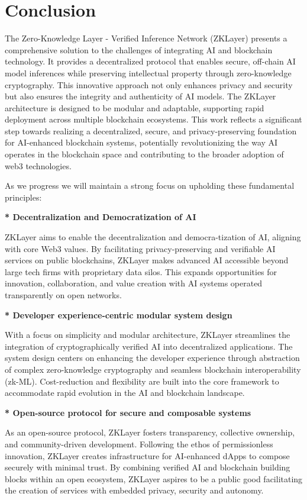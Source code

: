 \documentclass[conference]{IEEEtran}
\begin{document}
\section{Conclusion}
The Zero-Knowledge Layer - Veriﬁed Inference Network (ZKLayer) presents a comprehensive solution to the challenges of integrating AI and blockchain technology. It provides a decentralized protocol that enables secure, off-chain AI model inferences while preserving intellectual property through zero-knowledge cryptography. This innovative approach not only enhances privacy and security but also ensures the integrity and authenticity of AI models. The ZKLayer architecture is designed to be modular and adaptable, supporting rapid deployment across multiple blockchain ecosystems. This work reﬂects a signiﬁcant step towards realizing a decentralized, secure, and privacy-preserving foundation for AI-enhanced blockchain systems, potentially revolutionizing the way AI operates in the blockchain space and contributing to the broader adoption of web3 technologies.

As we progress we will maintain a strong focus on upholding these fundamental principles:

\textbf{* Decentralization and Democratization of AI}

ZKLayer aims to enable the decentralization and democra-tization of AI, aligning with core Web3 values. By facilitating privacy-preserving and veriﬁable AI services on public blockchains, ZKLayer makes advanced AI accessible beyond large tech ﬁrms with proprietary data silos. This expands opportunities for innovation, collaboration, and value creation with AI systems operated transparently on open networks.

\textbf{* Developer experience-centric modular system design}

With a focus on simplicity and modular architecture, ZKLayer streamlines the integration of cryptographically veriﬁed AI into decentralized applications. The system design centers on enhancing the developer experience through abstraction of complex zero-knowledge cryptography and seamless blockchain interoperability (zk-ML). Cost-reduction and ﬂexibility are built into the core framework to accommodate rapid evolution in the AI and blockchain landscape.

\textbf{* Open-source protocol for secure and composable systems}

As an open-source protocol, ZKLayer fosters transparency, collective ownership, and community-driven development. Following the ethos of permissionless innovation, ZKLayer creates infrastructure for AI-enhanced dApps to compose securely with minimal trust. By combining veriﬁed AI and blockchain building blocks within an open ecosystem, ZKLayer aspires to be a public good facilitating the creation of services with embedded privacy, security and autonomy.
\end{document}
